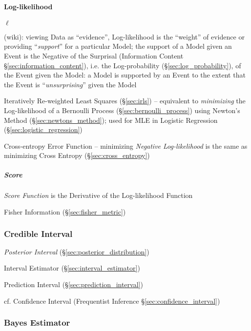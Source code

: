 \paragraph{Log-likelihood}\label{sec:log_likelihood}\hfill

$\ell$

(wiki): viewing Data as ``evidence'', Log-likelihood is the ``weight'' of
evidence or providing ``\emph{support}'' for a particular Model; the support of
a Model given an Event is the Negative of the Surprisal (Information Content
\S\ref{sec:information_content}), i.e. the Log-probability
(\S\ref{sec:log_probability}), of the Event given the Model: a Model is
supported by an Event to the extent that the Event is ``\emph{unsurprising}''
given the Model

Iteratively Re-weighted Least Squares (\S\ref{sec:irls}) -- equivalent to
\emph{minimizing} the Log-likelihood of a Bernoulli Process
(\S\ref{sec:bernoulli_process}) using Newton's Method
(\S\ref{sec:newtons_method}); used for MLE in Logistic Regression
(\S\ref{sec:logistic_regression})

\fist Cross-entropy Error Function -- minimizing \emph{Negative Log-likelihood}
is the same as minimizing Cross Entropy (\S\ref{sec:cross_entropy})



\subparagraph{Score}\label{sec:score}\hfill

\emph{Score Function} is the Derivative of the Log-likelihood Function

\fist Fisher Information (\S\ref{sec:fisher_metric})



\subsubsection{Credible Interval}\label{sec:credible_interval}

\emph{Posterior Interval} (\S\ref{sec:posterior_distribution})

Interval Estimator (\S\ref{sec:interval_estimator})

Prediction Interval (\S\ref{sec:prediction_interval})

cf. Confidence Interval (Frequentist Inference \S\ref{sec:confidence_interval})



\subsubsection{Bayes Estimator}\label{sec:bayes_estimator}\hfill

